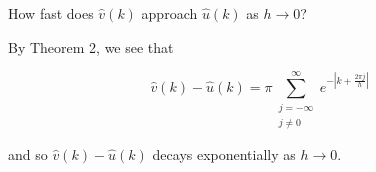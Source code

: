 How fast does $\hat{v}(k)$ approach $\hat{u}(k)$ as $h \to 0$?
 

\begin{solution}
  By Theorem 2, we see that

  $$
  \hat{v}(k) - \hat{u}(k) = \pi \sum_{\substack{j=-\infty \\ j \neq 0}}^{\infty} e^{-\left\vert k + \frac{2\pi j}{h} \right\vert}
  $$

  and so $\hat{v}(k) - \hat{u}(k)$ decays exponentially as $h \to 0$.

  \ \\
\end{solution}